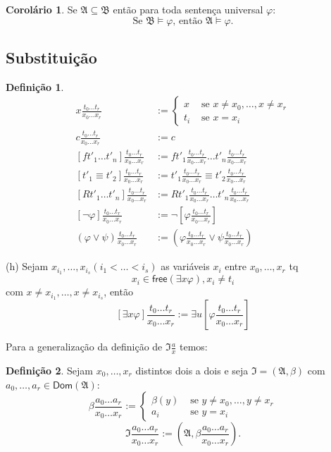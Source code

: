 \documentclass[11pt]{article}
\theoremstyle{definition}
\newtheorem{defn}{Definição}
\newtheorem{corollary}{Corolário}
\newcommand{\mf}[1]{\mathfrak{#1}}
\newcommand{\msf}[1]{\mathsf{#1}}
\begin{document}
\begin{corollary}
Se $\mf{A}\subseteq\mf{B}$ então para toda sentença universal $\varphi$:
\[
\text{Se }\mf{B}\vDash\varphi\text{, então }\mf{A}\vDash\varphi.
\]
\end{corollary}

\subsection{Substituição}

\begin{shaded}
\begin{defn}
\begin{align*}
x\frac{t_0\dots t_r}{x_0\dots x_r} & :=
\begin{cases}
x & \text{ se }x\ne x_0,\dots,x\ne x_r\\
t_i & \text{ se }x=x_i
\end{cases}\\
c\frac{t_0\dots t_r}{x_0\dots x_r} & :=c\\
[ft'_1\dots t'_n]\frac{t_0\dots t_r}{x_0\dots x_r} & :=ft'_1\frac{t_0\dots t_r}{x_0\dots x_r}\dots t'_n\frac{t_0\dots t_r}{x_0\dots x_r}\\
[t'_1\equiv t'_2]\frac{t_0\dots t_r}{x_0\dots x_r} & :=t'_1\frac{t_0\dots t_r}{x_0\dots x_r}\equiv t'_2\frac{t_0\dots t_r}{x_0\dots x_r}\\
[Rt'_1\dots t'_n]\frac{t_0\dots t_r}{x_0\dots x_r} & :=Rt'_1\frac{t_0\dots t_r}{x_0\dots x_r}\dots t'_n\frac{t_0\dots t_r}{x_0\dots x_r}\\
[\neg\varphi]\frac{t_0\dots t_r}{x_0\dots x_r} & :=\neg[\varphi\frac{t_0\dots t_r}{x_0\dots x_r}]\\
(\varphi\vee\psi)\frac{t_0\dots t_r}{x_0\dots x_r} & :=\left(\varphi\frac{t_0\dots t_r}{x_0\dots x_r}\vee\psi\frac{t_0\dots t_r}{x_0\dots x_r}\right)
\end{align*}

(h) Sejam $x_{i_1},\dots,x_{i_s} (i_1<\dots<i_s)$ as variáveis $x_i$ entre $x_0,\dots,x_r$ tq
\[
x_i\in\msf{free}(\exists x\varphi), x_i\ne t_i
\]
com $x\ne x_{i_1},\dots,x\ne x_{i_s}$, então
\[
[\exists x\varphi]\frac{t_0\dots t_r}{x_0\dots x_r}:=\exists u\left[\varphi\frac{t_0\dots t_r}{x_0\dots x_r}\right]
\]
\end{defn}
\end{shaded}

Para a generalização da definição de $\mf{I}\frac{a}{x}$ temos:

\begin{shaded}
\begin{defn}
Sejam $x_0,\dots,x_r$ distintos dois a dois e seja $\mf{I}=(\mf{A},\beta)$ com $a_0,\dots,a_r\in\msf{Dom}(\mf{A})$:
\[
\beta\frac{a_0\dots a_r}{x_0\dots x_r}:=\begin{cases}
\beta(y) & \text{ se }y\ne x_0,\dots,y\ne x_r\\
a_i & \text{ se }y=x_i
\end{cases}
\]
\[
\mf{I}\frac{a_0\dots a_r}{x_0\dots x_r}:=\left(\mf{A},\beta\frac{a_0\dots a_r}{x_0\dots x_r}\right).
\]
\end{defn}
\end{shaded}
\end{document}
